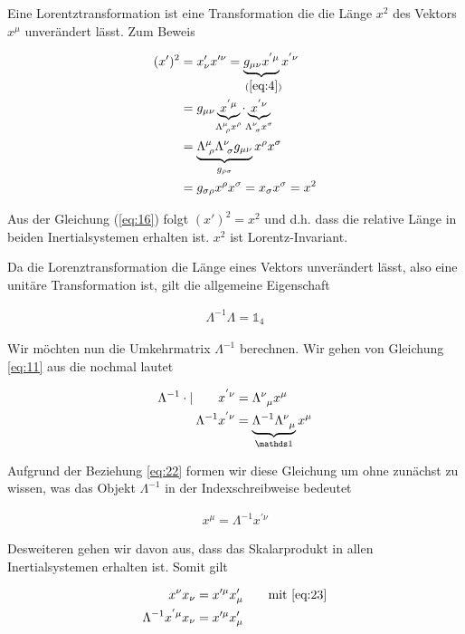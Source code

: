Eine Lorentztransformation ist eine Transformation die die Länge \(x^2\)  des Vektors \(x^\mu\) unverändert lässt. Zum Beweis

\begin{align}
  \label{eq:16}
  (x')^2 &= x'_\nu x'^\nu = \underbr{ g_{\mu\nu}x^{'\mu}}_{~(\ref{eq:4})}x^{'\nu} \notag \\
&=  g_{\mu\nu}\underbr{ x^{'\mu}}_{\Lambda^\mu_{\,\, \rho}x^\rho}\cdot \underbr{ x^{'\nu}}_{\Lambda^\nu_{\,\, \sigma}x^\sigma} \notag \\
 &= \underbrace{\Lambda^\mu_{\,\, \rho}  \Lambda^\nu_{\,\, \sigma}g_{\mu\nu}}_{g_{\rho\sigma}}x^\rho x^\sigma\notag \\
&= g_{\sigma\rho} x^\rho x^\sigma  = x_\sigma x^\sigma = x^2
\end{align}

Aus der Gleichung (\ref{eq:16})  folgt  \((x')^2 = x^2\) und d.h. dass die relative Länge in beiden Inertialsystemen erhalten ist. \(x^2\) ist Lorentz-Invariant. 


Da die Lorenztransformation die Länge eines Vektors unverändert lässt, also eine unitäre Transformation ist, gilt die allgemeine Eigenschaft


\begin{align}
  \label{eq:22}
  \Lambda^{-1}\Lambda=\mathds 1_4
\end{align}

Wir möchten nun die Umkehrmatrix  \(\Lambda^{-1}\) berechnen. Wir gehen von Gleichung \eqref{eq:11} aus die nochmal lautet

\begin{align}
  \label{eq:21}
 \Lambda^{-1}\cdot|\qquad   x^{'\nu} &= \Lambda^{\nu}_{\hphantom \nu \mu}x^\mu \\
 \Lambda^{-1}  x^{'\nu} &= \underbrace{ \Lambda^{-1}\Lambda^{\nu}_{\hphantom \nu \mu}}_{\mathds 1}x^\mu 
\end{align}

Aufgrund der Beziehung \eqref{eq:22} formen wir diese Gleichung um ohne zunächst zu wissen, was das Objekt \(\Lambda^{-1}\) in der Indexschreibweise bedeutet

\begin{align}
  \label{eq:23}
  x^{\mu} = \Lambda^{-1}x^{'\nu}
\end{align}

Desweiteren gehen wir davon aus, dass das Skalarprodukt in allen Inertialsystemen erhalten ist. Somit gilt

\begin{align}
  \label{eq:24}
  x^\nu x_\nu &= x'^{\mu}x'_{\mu} \qquad\text{mit }\eqref{eq:23}\notag\\
\Lambda^{-1}x^{'\mu} x_\nu &= x'^{\mu}x'_{\mu}
\end{align}


